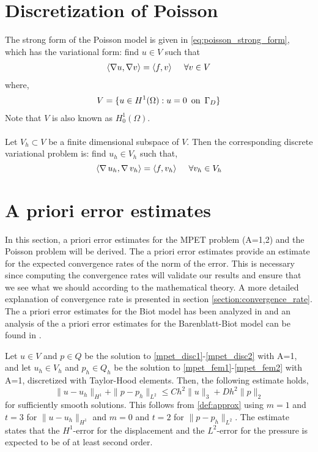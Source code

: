 \section{Discretization of Poisson} \label{disc_poisson}
The strong form of the Poisson model is given in \eqref{eq:poisson_strong_form}, which has the variational form: find $u \in V$ such that
\begin{align} \label{poisson_disc}
\langle \nabla u , \nabla v  \rangle = \langle f, v  \rangle \hspace{0.5cm} \forall v \in V
\end{align}
where,
\begin{align}
V = \{u \in H^1(\Omega) : u = 0 \,\,\, \textnormal{on} \,\,\, \Gamma_D \}
\end{align}
Note that $V$ is also known as $H^1_0(\Omega)$. 
\\
\\
Let $V_h \subset V$ be a finite dimensional subspace of $V$. Then the corresponding discrete variational problem is: find $u_h \in V_h$ such that,
\begin{equation} \label{eq:poisson_variational}
\langle \nabla \, u_h, \nabla \, v_h \rangle = \langle f, v_h  \rangle \hspace{0.5cm} \forall v_h \in V_h
\end{equation}

\section{A priori error estimates} \label{section:a_priori}
In this section, a priori error estimates for the MPET problem (A=1,2) and the Poisson problem will be derived. The a priori error estimates provide an estimate for the expected convergence rates of the norm of the error. This is necessary since computing the convergence rates will validate our results and ensure that we see what we should according to the mathematical theory. A more detailed explanation of convergence rate is presented in section \ref{section:convergence_rate}. The a priori error estimates for the Biot model has been analyzed in \cite{meunier} and an analysis of the a priori error estimates for the Barenblatt-Biot model can be found in \cite{boal}.
\\
\begin{definition}[\textbf{A priori error estimate (MPET, A=1)}]
Let $u\in V$ and $p \in Q$ be the solution to \eqref{mpet_disc1}-\eqref{mpet_disc2} with A=1, and let $u_h \in V_h$ and $p_h \in Q_h$ be the solution to \eqref{mpet_fem1}-\eqref{mpet_fem2} with A=1, discretized with Taylor-Hood elements. Then, the following estimate holds,
\begin{equation*}
\|u - u_h \|_{H^1} + \|p - p_h \|_{L^2} \leq Ch^2\|u \|_3 + Dh^2\|p \|_2
\end{equation*}
for sufficiently smooth solutions. This follows from \eqref{def:approx} using $m=1$ and $t=3$ for $\|u - u_h \|_{H^1}$ and $m=0$ and $t=2$ for $\|p - p_h \|_{L^2}$. The estimate states that the $H^1$-error for the displacement and the $L^2$-error for the pressure is expected to be of at least second order. 
\end{definition}

